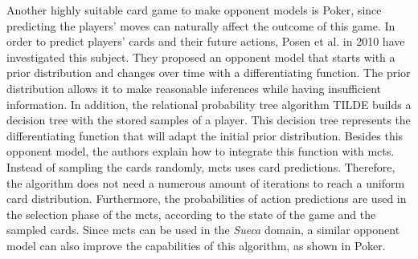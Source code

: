 Another highly suitable card game to make opponent models is Poker, since predicting the players' moves can naturally affect the outcome of this game.
In order to predict players' cards and their future actions, Posen et al. in 2010 \cite{Ponsen2008} have investigated this subject.
They proposed an opponent model that starts with a prior distribution and changes over time with a differentiating function.
The prior distribution allows it to make reasonable inferences while having insufficient information.
In addition, the relational probability tree algorithm TILDE builds a decision tree with the stored samples of a player.
This decision tree represents the differentiating function that will adapt the initial prior distribution.
Besides this opponent model, the authors explain how to integrate this function with \gls{mcts}.
Instead of sampling the cards randomly, \gls{mcts} uses card predictions.
Therefore, the algorithm does not need a numerous amount of iterations to reach a uniform card distribution.
Furthermore, the probabilities of action predictions are used in the selection phase of the \gls{mcts}, according to the state of the game and the sampled cards.
Since \gls{mcts} can be used in the \emph{Sueca} domain, a similar opponent model can also improve the capabilities of this algorithm, as shown in Poker.

 
 
 